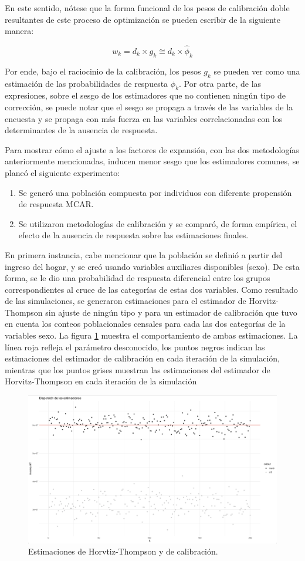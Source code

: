 \documentclass[
  12pt,
]{book}
\providecommand{\tightlist}{%
  \setlength{\itemsep}{0pt}\setlength{\parskip}{0pt}}
\begin{document}
En este sentido, nótese que la forma funcional de los pesos de calibración doble resultantes de este proceso de optimización se pueden escribir de la siguiente manera:

\[
w_k = d_k \times g_k  \cong d_k \times \hat \phi_k
\]

Por ende, bajo el raciocinio de la calibración, los pesos \(g_k\) se pueden ver como una estimación de las probabilidades de respuesta \(\phi_k\). Por otra parte, de las expresiones, sobre el sesgo de los estimadores que no contienen ningún tipo de corrección, se puede notar que el sesgo se propaga a través de las variables de la encuesta y se propaga con más fuerza en las variables correlacionadas con los determinantes de la ausencia de respuesta.

Para mostrar cómo el ajuste a los factores de expansión, con las dos metodologías anteriormente mencionadas, inducen menor sesgo que los estimadores comunes, se planeó el siguiente experimento:

\begin{enumerate}
\def\labelenumi{\arabic{enumi}.}
\tightlist
\item
  Se generó una población compuesta por individuos con diferente propensión de respuesta MCAR.
\item
  Se utilizaron metodologías de calibración y se comparó, de forma empírica, el efecto de la ausencia de respuesta sobre las estimaciones finales.
\end{enumerate}

En primera instancia, cabe mencionar que la población se definió a partir del ingreso del hogar, y se creó usando variables auxiliares disponibles (sexo). De esta forma, se le dio una probabilidad de respuesta diferencial entre los grupos correspondientes al cruce de las categorías de estas dos variables. Como resultado de las simulaciones, se generaron estimaciones para el estimador de Horvitz-Thompson sin ajuste de ningún tipo y para un estimador de calibración que tuvo en cuenta los conteos poblacionales censales para cada las dos categorías de la variables sexo. La figura \ref{fig:fightcal} muestra el comportamiento de ambas estimaciones. La línea roja refleja el parámetro desconocido, los puntos negros indican las estimaciones del estimador de calibración en cada iteración de la simulación, mientras que los puntos grises muestran las estimaciones del estimador de Horvitz-Thompson en cada iteración de la simulación

\begin{figure}

{\centering \includegraphics[width=0.5\linewidth]{Pics/c9} 

}

\caption{Estimaciones de Horvtiz-Thompson y de calibración.}\label{fig:fightcal}
\end{figure}
\end{document}
